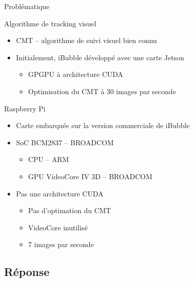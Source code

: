 \documentclass{bredelebeamer}
\begin{document}
\begin{frame}{Problématique}

\begin{block}{Algorithme de tracking visuel}
\begin{itemize}
\item CMT -- algorithme de suivi visuel bien connu
\item Initialement, iBubble développé avec une carte Jetson
\begin{itemize}
\item GPGPU à architecture CUDA
\item Optimisation du CMT à 30 images par seconde
\end{itemize}
\end{itemize}
\end{block}

\begin{block}{Raspberry Pi}
\begin{itemize}
\item Carte embarquée sur la version commerciale de iBubble
\item SoC BCM2837 -- BROADCOM
\begin{itemize}
\item CPU -- ARM
\item GPU VideoCore IV 3D -- BROADCOM
\end{itemize}
\item Pas une architecture CUDA
\begin{itemize}
	\item Pas d'optimation du CMT
	\item VideoCore inutilisé
	\item 7 images par seconde
\end{itemize}
\end{itemize}
\end{block}

\end{frame}





	\subsection{Réponse}

\end{document}
